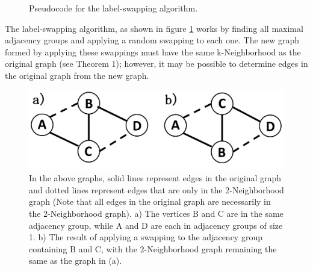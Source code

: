 \begin{figure}[htb]
	\begin{algorithmic}
		\renewcommand{\algorithmicrequire}{\textbf{Input:}}
		\renewcommand{\algorithmicensure}{\textbf{Output:}}
		\EndFor
		\EndFor
		\EndFor
		\State {}
	\end{algorithmic}
	\caption{Pseudocode for the label-swapping algorithm.}
	\label{fig:label-swap}
\end{figure}

\indent The label-swapping algorithm, as shown in figure \ref{fig:label-swap} works by finding all maximal adjacency groups and applying a random swapping to each one. The new graph formed by applying these swappings must have the same k-Neighborhood as the original graph (see Theorem 1); however, it may be possible to determine edges in the original graph from the new graph.
\\

\begin{figure}[ht]
  \centering
  \includegraphics[scale=0.3 ]{Sample-Graph.png}
  \caption{In the above graphs, solid lines represent edges in the original graph and dotted lines represent edges that are only in the 2-Neighborhood graph (Note that all edges in the original graph are necessarily in the 2-Neighborhood graph). a)  The vertices B and C are in the same adjacency group, while A and D are each in adjacency groups of size 1. b) The result of applying a swapping to the adjacency group containing B and C, with the 2-Neighborhood graph remaining the same as the graph in (a).}
  \label{fig:sample graph}
\end{figure}





